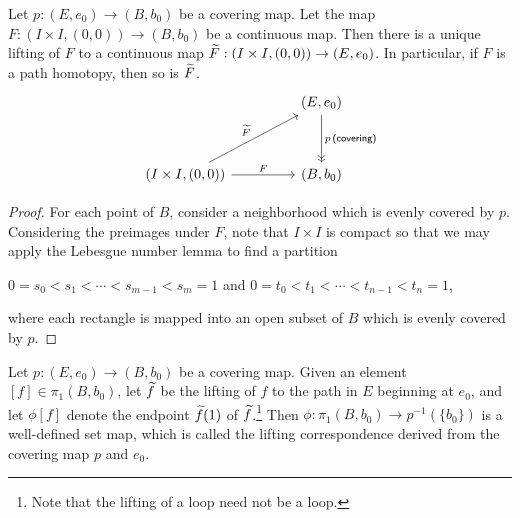 \begin{lem}
    Let $p: (E, e_0)\rightarrow (B, b_0)$ be a covering map.
    Let the map $F: (I\times I, (0, 0))\rightarrow (B, b_0)$ be a continuous map.
    Then there is a unique lifting of $F$ to a continuous map $\widetilde{F}: (I\times I, (0, 0))\rightarrow (E, e_0)$.
    In particular, if $F$ is a path homotopy, then so is $\widetilde{F}$.
    \begin{equation*}
    \begin{tikzcd}[row sep=1.2cm, column sep=1.6cm]
        &
        (E, e_0)
        \arrow[d, "p\,\textsf{(covering)}", ->>]
        \\
        (I\times I, (0, 0))
        \arrow[ur, "\wt{F}"]
        \arrow[r, "F"]
        &
        (B, b_0)
    \end{tikzcd}
    \end{equation*}
\end{lem}
\begin{proof}
    For each point of $B$, consider a neighborhood which is evenly covered by $p$.
    Considering the preimages under $F$, note that $I\times I$ is compact so that we may apply the Lebesgue number lemma to find a partition
    \begin{center}
        $0=s_0<s_1<\cdots<s_{m-1}<s_m=1$ and $0=t_0<t_1<\cdots<t_{n-1}<t_n=1$,
    \end{center}
    where each rectangle is mapped into an open subset of $B$ which is evenly covered by $p$.
\end{proof}

\begin{defi}
    Let $p: (E, e_0)\rightarrow (B, b_0)$ be a covering map.
    Given an element $[f]\in\pi_1(B, b_0)$, let $\widetilde{f}$ be the lifting of $f$ to the path in $E$ beginning at $e_0$, and let $\phi[f]$ denote the endpoint $\widetilde{f}(1)$ of $\widetilde{f}$.\footnote{Note that the lifting of a loop need not be a loop.}
    Then $\phi: \pi_1(B, b_0)\rightarrow p^{-1}(\{b_0\})$ is a well-defined set map, which is called the lifting correspondence derived from the covering map $p$ and $e_0$.
\end{defi}

